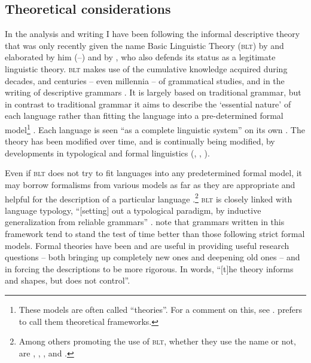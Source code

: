 \subsection{Theoretical considerations}
In the analysis and writing I have been following the informal descriptive theory that was only recently given the name Basic Linguistic Theory (\textsc{blt}) by \citet{Dixon1997} and elaborated by him (\citeyear{Dryer2010}--\citeyear{Dryer2012}) and by \citet{Dryer2006a, 2006b}, who also defends its status as a legitimate linguistic theory. \textsc{blt} makes use of the cumulative knowledge acquired during decades, and centuries -- even millennia -- of grammatical studies, and in the writing of descriptive grammars \citep[3]{Dixon2010}. It is largely based on traditional grammar, but in contrast to traditional grammar it aims to describe the `essential nature' of each language rather than fitting the language into a pre-determined formal model\footnote{These models are often called ``theories''.  For a comment on this, see \citet[131]{Dixon1997}. \citet{Dryer2006a} prefers to call them theoretical frameworks.} \citep[211]{Dryer2006a}. Each language is seen ``as a complete linguistic system'' on its own \citep[4]{Dixon2010}. The theory has been modified over time, and is continually being modified, by developments in typological and formal linguistics (\citealt{EvansEtAl2006}, \citealt{Rice2006a, Rice2006b}, \citealt[3]{Dixon2010}).  

Even if \textsc{blt} does not try to fit languages into any predetermined formal model, it may borrow formalisms from various models as far as they are appropriate and helpful for the description of a particular language \citep[128--135]{Dixon1997}.\footnote{Among others promoting the use of \textsc{blt}, whether they use the name or not, are
\citet[354]{Noonan2006}, 
\citet{Rice2006a, Rice2006b}, 
\citet{EvansEtAl2006}, and \citet{Payne1997, Payne2006}.}  \textsc{blt} is closely linked with language typology, ``[setting] out a typological paradigm, by inductive generalization from reliable grammars'' \citep[205]{Dixon2010}. \citet[6]{EvansEtAl2006} note that grammars written in this framework tend to stand the test of time better than those following strict formal models. Formal theories have been and are useful in providing useful research questions -- both bringing up completely new ones and deepening old ones -- and in forcing the descriptions to be more rigorous. In  words, ``[t]he theory informs and shapes, but does not control''. 





